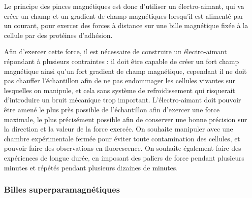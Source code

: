 Le principe des pinces magnétiques est donc d'utiliser un électro-aimant, qui va créer un champ et un gradient de champ magnétiques lorsqu'il est alimenté par un courant, pour exercer des forces à distance sur une bille magnétique fixée à la cellule par des protéines d'adhésion. 	 
	 
	 
	 Afin d'exercer cette force, il est nécessaire de construire un électro-aimant répondant à plusieurs contraintes : il doit être capable de créer un fort champ magnétique ainsi qu'un fort gradient de champ magnétique, cependant il ne doit pas chauffer l'échantillon afin de ne pas endommager les cellules vivantes sur lesquelles on manipule, et cela sans système de refroidissement qui risquerait d'introduire un bruit mécanique trop important. L'électro-aimant doit pouvoir être amené le plus près possible de l'échantillon afin d'exercer une force maximale, le plus précisément possible afin de conserver une bonne précision sur la direction et la valeur de la force exercée. On souhaite manipuler avec une chambre expérimentale fermée pour éviter toute contamination des cellules, et pouvoir faire des observations en fluorescence. On souhaite également faire des expériences de longue durée, en imposant des paliers de force pendant plusieurs minutes et répétés pendant plusieurs dizaines de minutes.	
	
		\subsubsection{Billes superparamagnétiques}
		
